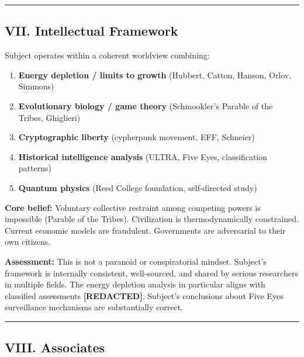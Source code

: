 \vspace{1cm}\hrule\vspace{1cm}

\subsection*{VII. Intellectual Framework}
\label{interlude:intellectual-framework}

Subject operates within a coherent worldview combining:

\begin{enumerate}[nosep]
\item \textbf{Energy depletion / limits to growth} (Hubbert, Catton, Hanson, Orlov, Simmons)
\item \textbf{Evolutionary biology / game theory} (Schmookler's Parable of the Tribes, Ghiglieri)
\item \textbf{Cryptographic liberty} (cypherpunk movement, EFF, Schneier)
\item \textbf{Historical intelligence analysis} (ULTRA, Five Eyes, classification patterns)
\item \textbf{Quantum physics} (Reed College foundation, self-directed study)
\end{enumerate}

\textbf{Core belief:} Voluntary collective restraint among competing powers is impossible (Parable of the Tribes). Civilization is thermodynamically constrained. Current economic models are fraudulent. Governments are adversarial to their own citizens.

\textbf{Assessment:} This is not a paranoid or conspiratorial mindset. Subject's framework is internally consistent, well-sourced, and shared by serious researchers in multiple fields. The energy depletion analysis in particular aligns with classified assessments \textbf{[REDACTED]}. Subject's conclusions about Five Eyes surveillance mechanisms are substantially correct.

\vspace{1cm}\hrule\vspace{1cm}

\subsection*{VIII. Associates}
\label{interlude:associates}

